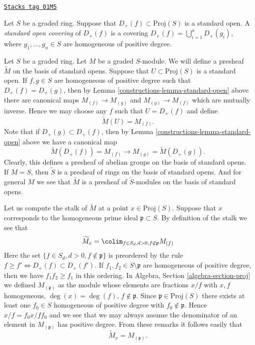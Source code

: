 \begin{definition}
\label{constructions-definition-standard-covering}
\href{https://stacks.math.columbia.edu/tag/01M5}{\texttt{Stacks tag 01M5}}

Let $S$ be a graded ring.
Suppose that $D_{+}(f) \subset \text{Proj}(S)$ is a standard
open. A {\it standard open covering} of $D_{+}(f)$
is a covering $D_{+}(f) = \bigcup_{i = 1}^n D_{+}(g_i)$,
where $g_1, \ldots, g_n \in S$ are homogeneous of positive degree.
\end{definition}

Let $S$ be a graded ring. Let $M$ be a graded $S$-module. We will define
a presheaf $\widetilde M$ on the basis of standard opens.
Suppose that $U \subset \text{Proj}(S)$ is a standard open.
If $f, g \in S$ are homogeneous of positive degree
such that $D_{+}(f) = D_{+}(g)$, then
by Lemma \ref{constructions-lemma-standard-open} above there are canonical
maps $M_{(f)} \to M_{(g)}$ and $M_{(g)} \to M_{(f)}$ which are
mutually inverse. Hence we may choose any $f$ such that $U = D_{+}(f)$
and define
$$
\widetilde M(U) = M_{(f)}.
$$
Note that if $D_{+}(g) \subset D_{+}(f)$, then by
Lemma \ref{constructions-lemma-standard-open} above we have
a canonical map
$$
\widetilde M(D_{+}(f)) = M_{(f)} \longrightarrow
M_{(g)} = \widetilde M(D_{+}(g)).
$$
Clearly, this defines a presheaf of abelian groups on the basis
of standard opens. If $M = S$, then $\widetilde S$ is a presheaf
of rings on the basis of standard opens. And for general $M$ we
see that $\widetilde M$ is a presheaf of $\widetilde S$-modules
on the basis of standard opens.

\medskip\noindent
Let us compute the stalk of $\widetilde M$ at a point
$x \in \text{Proj}(S)$.
Suppose that $x$ corresponds to the homogeneous prime
ideal $\mathfrak p \subset S$.
By definition of the stalk we see that
$$
\widetilde M_x
=
\colim_{f\in S_d, d > 0, f\not\in \mathfrak p} M_{(f)}
$$
Here the set $\{f \in S_d, d > 0, f \not \in \mathfrak p\}$ is preordered by
the rule $f \geq f' \Leftrightarrow D_{+}(f) \subset D_{+}(f')$.
If $f_1, f_2 \in S \setminus \mathfrak p$ are homogeneous of positive
degree, then we have
$f_1f_2 \geq f_1$ in this ordering. In
Algebra, Section \ref{algebra-section-proj}
we defined $M_{(\mathfrak p)}$ as the module whose elements are fractions
$x/f$ with $x, f$ homogeneous, $\deg(x) = \deg(f)$, $f \not \in \mathfrak p$.
Since $\mathfrak p \in \text{Proj}(S)$ there exists at least
one $f_0 \in S$ homogeneous of positive degree with $f_0 \not\in \mathfrak p$.
Hence $x/f = f_0x/ff_0$ and we see that we may always assume
the denominator of an element in $M_{(\mathfrak p)}$ has positive degree.
From these remarks it follows easily that
$$
\widetilde M_x = M_{(\mathfrak p)}.
$$

